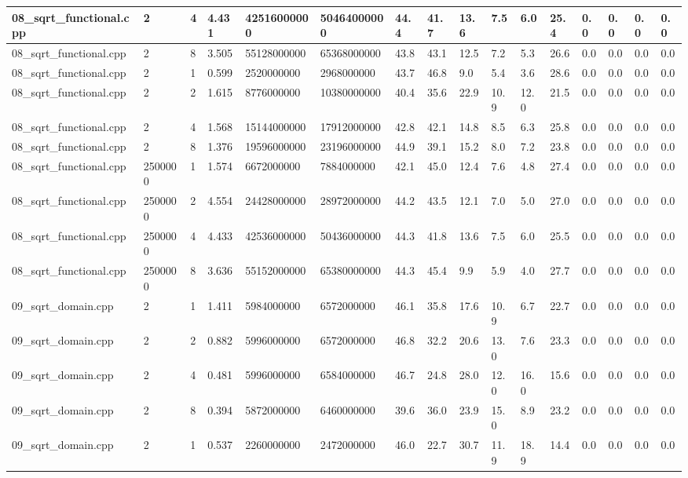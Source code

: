 \documentclass[12pt]{article}
\begin{document}
\begin{flushleft}
\begin{tabular}{| l | l | l | l | l | l | l | l | l | l | l | l | l | l | l | l |}
		08\_sqrt\_functional.cpp & 2 & 4 & 4.431 & 42516000000 & 50464000000 & 44.4 & 41.7 & 13.6 & 7.5 & 6.0 & 25.4 & 0.0 & 0.0 & 0.0 & 0.0 \\ \hline
		08\_sqrt\_functional.cpp & 2 & 8 & 3.505 & 55128000000 & 65368000000 & 43.8 & 43.1 & 12.5 & 7.2 & 5.3 & 26.6 & 0.0 & 0.0 & 0.0 & 0.0 \\ \hline
		08\_sqrt\_functional.cpp & 2 & 1 & 0.599 & 2520000000 & 2968000000 & 43.7 & 46.8 & 9.0 & 5.4 & 3.6 & 28.6 & 0.0 & 0.0 & 0.0 & 0.0 \\ \hline
		08\_sqrt\_functional.cpp & 2 & 2 & 1.615 & 8776000000 & 10380000000 & 40.4 & 35.6 & 22.9 & 10.9 & 12.0 & 21.5 & 0.0 & 0.0 & 0.0 & 0.0 \\ \hline
		08\_sqrt\_functional.cpp & 2 & 4 & 1.568 & 15144000000 & 17912000000 & 42.8 & 42.1 & 14.8 & 8.5 & 6.3 & 25.8 & 0.0 & 0.0 & 0.0 & 0.0 \\ \hline
		08\_sqrt\_functional.cpp & 2 & 8 & 1.376 & 19596000000 & 23196000000 & 44.9 & 39.1 & 15.2 & 8.0 & 7.2 & 23.8 & 0.0 & 0.0 & 0.0 & 0.0 \\ \hline
		08\_sqrt\_functional.cpp & 2500000 & 1 & 1.574 & 6672000000 & 7884000000 & 42.1 & 45.0 & 12.4 & 7.6 & 4.8 & 27.4 & 0.0 & 0.0 & 0.0 & 0.0 \\ \hline
		08\_sqrt\_functional.cpp & 2500000 & 2 & 4.554 & 24428000000 & 28972000000 & 44.2 & 43.5 & 12.1 & 7.0 & 5.0 & 27.0 & 0.0 & 0.0 & 0.0 & 0.0 \\ \hline
		08\_sqrt\_functional.cpp & 2500000 & 4 & 4.433 & 42536000000 & 50436000000 & 44.3 & 41.8 & 13.6 & 7.5 & 6.0 & 25.5 & 0.0 & 0.0 & 0.0 & 0.0 \\ \hline
		08\_sqrt\_functional.cpp & 2500000 & 8 & 3.636 & 55152000000 & 65380000000 & 44.3 & 45.4 & 9.9 & 5.9 & 4.0 & 27.7 & 0.0 & 0.0 & 0.0 & 0.0 \\ \hline
		09\_sqrt\_domain.cpp & 2 & 1 & 1.411 & 5984000000 & 6572000000 & 46.1 & 35.8 & 17.6 & 10.9 & 6.7 & 22.7 & 0.0 & 0.0 & 0.0 & 0.0 \\ \hline
		09\_sqrt\_domain.cpp & 2 & 2 & 0.882 & 5996000000 & 6572000000 & 46.8 & 32.2 & 20.6 & 13.0 & 7.6 & 23.3 & 0.0 & 0.0 & 0.0 & 0.0 \\ \hline
		09\_sqrt\_domain.cpp & 2 & 4 & 0.481 & 5996000000 & 6584000000 & 46.7 & 24.8 & 28.0 & 12.0 & 16.0 & 15.6 & 0.0 & 0.0 & 0.0 & 0.0 \\ \hline
		09\_sqrt\_domain.cpp & 2 & 8 & 0.394 & 5872000000 & 6460000000 & 39.6 & 36.0 & 23.9 & 15.0 & 8.9 & 23.2 & 0.0 & 0.0 & 0.0 & 0.0 \\ \hline
		09\_sqrt\_domain.cpp & 2 & 1 & 0.537 & 2260000000 & 2472000000 & 46.0 & 22.7 & 30.7 & 11.9 & 18.9 & 14.4 & 0.0 & 0.0 & 0.0 & 0.0 \\ \hline

\end{tabular}
\end{flushleft}
\end{document}
